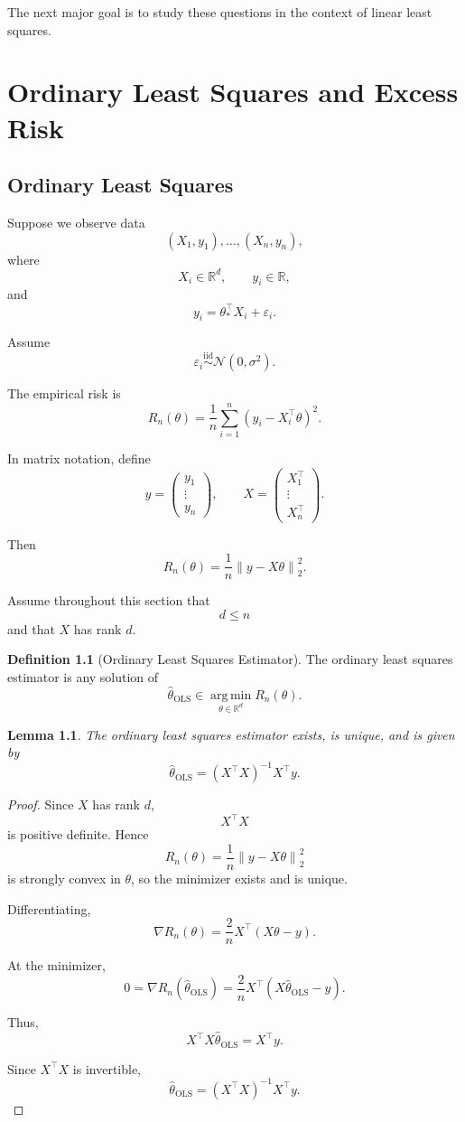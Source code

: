 \documentclass[12pt,oneside]{book}
\numberwithin{equation}{section}
\theoremstyle{definition}
\newtheorem{definition}{Definition}[section]
\theoremstyle{plain}
\newtheorem{lemma}{Lemma}[section]
\theoremstyle{remark}
\newcommand{\R}{\mathbb{R}}
\newcommand{\iid}{\overset{\text{iid}}{\sim}}
\newcommand{\argmin}{\operatorname*{arg\,min}}
\newcommand{\norm}[1]{\left\lVert #1 \right\rVert}
\newcommand{\Normal}{\mathcal{N}}
\begin{document}
The next major goal is to study these questions in the context of linear least squares.

\chapter{Ordinary Least Squares and Excess Risk}

\section{Ordinary Least Squares}

Suppose we observe data
\[
(X_1,y_1),\dots,(X_n,y_n),
\]
where
\[
X_i\in\R^d,
\qquad
y_i\in\R,
\]
and
\[
y_i=\theta_*^\top X_i+\varepsilon_i.
\]

Assume
\[
\varepsilon_i\iid \Normal(0,\sigma^2).
\]

The empirical risk is
\[
R_n(\theta)
=
\frac{1}{n}\sum_{i=1}^n
(y_i-X_i^\top\theta)^2.
\]

In matrix notation, define
\[
y=
\begin{pmatrix}
y_1\\
\vdots\\
y_n
\end{pmatrix},
\qquad
X=
\begin{pmatrix}
X_1^\top\\
\vdots\\
X_n^\top
\end{pmatrix}.
\]

Then
\[
R_n(\theta)
=
\frac{1}{n}\norm{y-X\theta}_2^2.
\]

Assume throughout this section that
\[
d\leq n
\]
and that $X$ has rank $d$.

\begin{definition}[Ordinary Least Squares Estimator]
The ordinary least squares estimator is any solution of
\[
\widehat{\theta}_{\mathrm{OLS}}
\in
\argmin_{\theta\in\R^d}
R_n(\theta).
\]
\end{definition}

\begin{lemma}
The ordinary least squares estimator exists, is unique, and is given by
\[
\widehat{\theta}_{\mathrm{OLS}}
=
(X^\top X)^{-1}X^\top y.
\]
\end{lemma}

\begin{proof}
Since $X$ has rank $d$,
\[
X^\top X
\]
is positive definite. Hence
\[
R_n(\theta)
=
\frac{1}{n}\norm{y-X\theta}_2^2
\]
is strongly convex in $\theta$, so the minimizer exists and is unique.

Differentiating,
\[
\nabla R_n(\theta)
=
\frac{2}{n}X^\top(X\theta-y).
\]

At the minimizer,
\[
0
=
\nabla R_n(\widehat{\theta}_{\mathrm{OLS}})
=
\frac{2}{n}X^\top(X\widehat{\theta}_{\mathrm{OLS}}-y).
\]

Thus,
\[
X^\top X\widehat{\theta}_{\mathrm{OLS}}
=
X^\top y.
\]

Since $X^\top X$ is invertible,
\[
\widehat{\theta}_{\mathrm{OLS}}
=
(X^\top X)^{-1}X^\top y.
\]
\end{proof}
\end{document}
